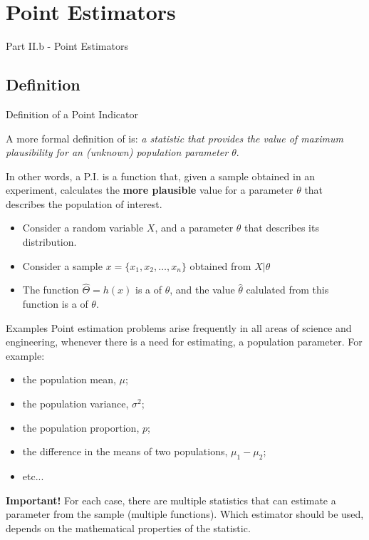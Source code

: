 \section{Point Estimators}
\begin{frame}
  \begin{center}
    Part II.b - Point Estimators
  \end{center}
\end{frame}

\subsection{Definition}

\begin{frame}{Definition of a Point Indicator}

A more formal definition of  is: \emph{a statistic
that provides the value of maximum plausibility for an (unknown) population
parameter $\theta$}.\bigskip

In other words, a P.I. is a function that, given a sample obtained in an
experiment, calculates the {\bf more plausible} value for a parameter $\theta$
that describes the population of interest.\bigskip

\begin{itemize}
  \item Consider a random variable $X$, and a parameter $\theta$ that describes its distribution.
  \item Consider a sample $x = \{x_1, x_2, \ldots, x_n\}$ obtained from $X|\theta$
  \item The function $\hat{\Theta} = h\left(x\right)$ is a  of $\theta$, and the value $\hat\theta$ calulated from this function is a  of $\theta$.
\end{itemize}
\end{frame}

\begin{frame}{Examples}
Point estimation problems arise frequently in all areas of science and engineering, whenever there is a need for estimating, a population parameter. For example:\bigskip

\begin{itemize}
  \item the population mean, $\mu$;
	\item the population variance, $\sigma^2$;
	\item the population proportion, $p$;
	\item the difference in the means of two populations, $\mu_1-\mu_2$;
	\item etc...
\end{itemize}\bigskip

{\bf Important!} For each case, there are multiple statistics that can estimate a parameter from the sample (multiple functions). Which estimator should be used, depends on the mathematical properties of the statistic.
\end{frame}

